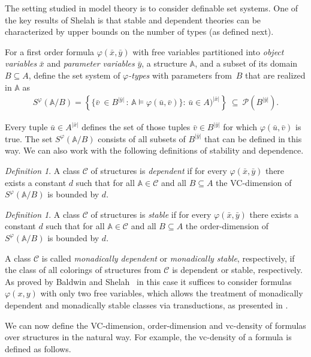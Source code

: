 \documentclass[1p,number,a4paper]{elsarticle}
\theoremstyle{remark}
\newcommand{\Cc}{\mathscr{C}}
\newcommand{\Pp}{\mathcal{P}}
\newcommand{\strA}{\mathbb{A}}
\renewcommand{\phi}{\varphi}
\newtheorem{definition}[theorem]{Definition}
\begin{document}
The setting studied in model theory is to consider definable set systems. 
One of the key results of Shelah is that stable and dependent theories can be characterized by upper bounds on the number of types (as defined next). 

For a first order formula $\phi(\bar x,\bar y)$ 
with free variables partitioned into \emph{object variables} $\bar x$ and \emph{parameter variables} $\bar y$, a structure $\strA$,
and a subset of its domain $B\subseteq A$, define
the set system of \emph{$\phi$-types} with parameters from~$B$ that are realized in $\strA$ as 
\begin{align*}
S^\phi(\strA/B)=\left\{\big\{\bar v\ \in B^{|\bar y|}\, \colon\, \strA\models\phi(\bar u,\bar v)\big\} \colon\, \bar u\in A)^{|\bar x|}\right\}\ \subseteq\  \Pp(B^{|\bar y|}).
\end{align*}

Every tuple $\bar u\in A^{|\bar x|}$ defines the set of those tuples $\bar v\in B^{|\bar y|}$ for which $\phi(\bar u,\bar v)$ is true.
The set $S^\phi(\strA/B)$ consists of all subsets of $B^{|\bar y|}$ that can be defined in this way.
We can also work with the following definitions of stability and dependence. 

\begin{definition}
    A class $\Cc$ of structures is \emph{dependent} if for every $\phi(\bar x,\bar y)$ there exists a constant $d$ such that for all $\strA\in \Cc$ and all $B\subseteq A$ the VC-dimension of $S^\phi(\strA/B)$ is bounded by $d$. 
\end{definition}

\begin{definition}
    A class $\Cc$ of structures is \emph{stable} if for every $\phi(\bar x,\bar y)$ there exists a constant $d$ such that for all $\strA\in \Cc$ and all $B\subseteq A$ the order-dimension of $S^\phi(\strA/B)$ is bounded by $d$. 
\end{definition}

A class $\Cc$ is called \emph{monadically dependent} or \emph{monadically stable}, respectively, if the class of all colorings of structures from $\Cc$ is dependent or stable, respectively. 
As proved by Baldwin and Shelah~\cite{baldwin1985second} in this case it suffices to consider formulas $\phi(x,y)$ with only two free variables, which allows the treatment of monadically dependent and monadically stable classes via transductions, as presented in . 

We can now define the VC-dimension, order-dimension and vc-density of formulas over structures in the natural way. 
For example, the vc-density of a formula is defined as follows. 
\end{document}
